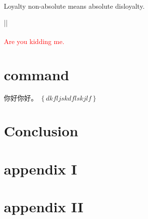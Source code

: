 \documentclass{ctexart}
\newcommand{\ac}[1]{\left\{ #1 \right\}}
\begin{document}
\begin{nikname}
	\colorbox[gray]{0.95}{Loyalty non-absolute means absolute disloyalty.}
\end{nikname}
||\\
\setlength{\fboxrule}{13pt}
\setlength{\fboxsep}{1em}
\\
\textcolor{red}{Are you kidding me.}
\section{command}
你好你好。
$\ac{dkfljskdflskjlf}$
\section{Conclusion}
\begin{center} 
\end{center}
\appendix
\section{appendix I}
\section{appendix II}
\end{document}

